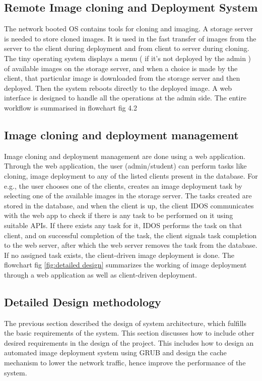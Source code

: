 \documentclass[a4paper,12pt]{article}
\begin{document}
\subsection{ Remote Image cloning and Deployment System}
  The network booted OS contains tools for cloning and imaging. A storage server is needed to store cloned images. It is used in the fast transfer of images from the server to the client during deployment and from client to server during cloning.
  The tiny operating system displays a menu ( if it's not deployed by the admin ) of available images on the storage server, and when a choice is made by the client, that particular image is downloaded from the storage server and then deployed. Then the system reboots directly to the deployed image. A web interface is designed to handle all the operations at the admin side.
  The entire workflow is summarised in flowchart fig 4.2
  \newline

\subsection{ Image cloning and deployment management}
Image cloning and deployment management are done using a web application. Through the web application, the user (admin/student) can perform tasks like cloning, image deployment to any of the listed clients present in the database. For e.g., the user chooses one of the clients, creates an image deployment task by selecting one of the available images in the storage server. The tasks created are stored in the database, and when the client is up, the client IDOS communicates with the web app to check if there is any task to be performed on it using suitable APIs. If there exists any task for it, IDOS performs the task on that client, and on successful completion of the task, the client signals task completion to the web server, after which the web server removes the task from the database. If no assigned task exists, the client-driven image deployment is done. The flowchart fig \ref{fig:detailed design} summarizes the working of image deployment through a web application as well as client-driven deployment.
\subsection{Detailed Design methodology}
The previous section described the design of system architecture, which fulfills the basic requirements of the system. This section discusses how to include other desired requirements in the design of the project. This includes how to design an automated image deployment system using GRUB  and design the cache mechanism to lower the network traffic, hence improve the performance of the system.
\end{document}
